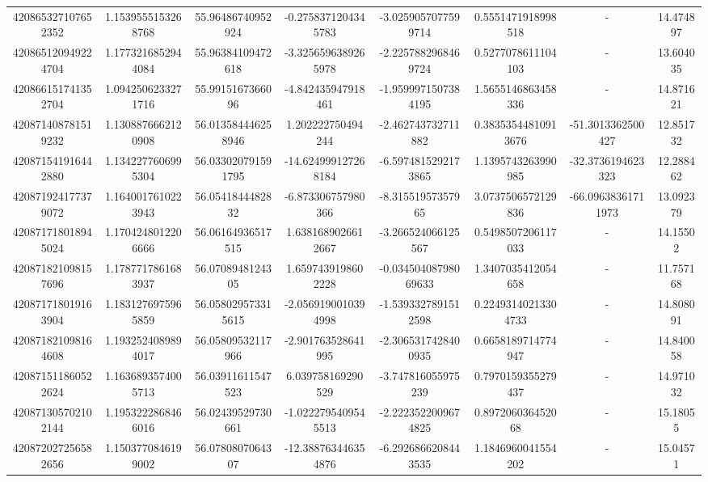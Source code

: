 \documentclass{article}
\begin{document}
\begin{landscape}
\begin{longtable}[c]{S[table-format=18.0]S[table-format=2.15]S[table-format=2.15]S[table-format=-2.17]S[table-format=-2.16]S[table-format=-2.16]S[table-format=-3.16]S[table-format=2.7]}
420865327107652352 & 1.1539555153268768 & 55.96486740952924  & -0.2758371204345783  & -3.0259057077599714    & 0.5551471918998518  & {-}                  & 14.474897  \\
420865120949224704 & 1.1773216852944084 & 55.96384109472618  & -3.3256596389265978  & -2.2257882968469724    & 0.5277078611104103  & {-}                  & 13.604035  \\
420866151741352704 & 1.0942506233271716 & 55.9915167366096   & -4.842435947918461   & -1.9599971507384195    & 1.5655146863458336  & {-}                  & 14.871621  \\
420871408781519232 & 1.1308876662120908 & 56.013584446258946 & 1.202222750494244    & -2.462743732711882     & 0.38353544810913676 & -51.3013362500427   & 12.851732  \\
420871541916442880 & 1.1342277606995304 & 56.033020791591795 & -14.624999127268184  & -6.5974815292173865    & 1.1395743263990985  & -32.3736194623323   & 12.288462  \\
420871924177379072 & 1.1640017610223943 & 56.0541844482832   & -6.873306757980366   & -8.31551957357965      & 3.0737506572129836  & -66.09638361711973  & 13.092379  \\
420871718018945024 & 1.1704248012206666 & 56.06164936517515  & 1.6381689026612667   & -3.266524066125567     & 0.5498507206117033  & {-}                  & 14.15502   \\
420871821098157696 & 1.1787717861683937 & 56.0708948124305   & 1.6597439198602228   & -0.03450408798069633   & 1.3407035412054658  & {-}                  & 11.757168  \\
420871718019163904 & 1.1831276975965859 & 56.058029573315615 & -2.0569190010394998  & -1.5393327891512598    & 0.22493140213304733 & {-}                  & 14.808091  \\
420871821098164608 & 1.1932524089894017 & 56.05809532117966  & -2.901763528641995   & -2.3065317428400935    & 0.6658189714774947  & {-}                  & 14.840058  \\
420871511860522624 & 1.1636893574005713 & 56.03911611547523  & 6.039758169290529    & -3.747816055975239     & 0.7970159355279437  & {-}                  & 14.971032  \\
420871305702102144 & 1.1953222868466016 & 56.02439529730661  & -1.0222795409545513  & -2.2223522009674825    & 0.897206036452068   & {-}                  & 15.18055   \\
420872027256582656 & 1.1503770846199002 & 56.0780807064307   & -12.388763446354876  & -6.2926866208443535    & 1.1846960041554202  & {-}                  & 15.04571   \\

\end{longtable}
\end{landscape}
\end{document}
